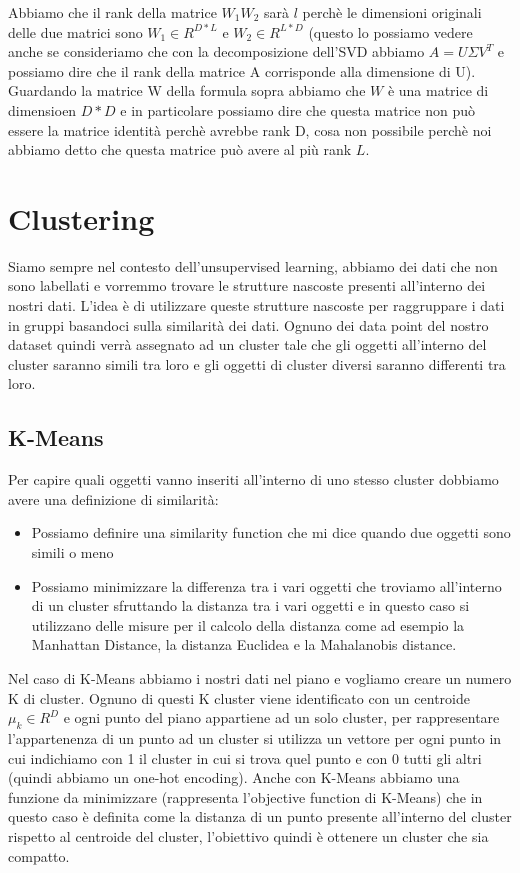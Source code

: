 \documentclass[14pt]{extreport}
\begin{document}
Abbiamo che il rank della matrice $W_1W_2$ sarà $l$ perchè le dimensioni originali delle due matrici sono $W_1 \in R^{D*L}$ e $W_2 \in R^{L*D}$ (questo lo 
possiamo vedere anche se consideriamo che con la decomposizione dell'SVD abbiamo $A = U \Sigma V^{T}$ e possiamo dire che il rank della matrice A corrisponde 
alla dimensione di U).
Guardando la matrice W della formula sopra abbiamo che $W$ è una matrice di dimensioen $D*D$ e in particolare possiamo dire che questa matrice 
non può essere la matrice identità perchè avrebbe rank D, cosa non possibile perchè noi abbiamo detto che questa matrice può avere al più rank $L$.

\chapter{Clustering}

Siamo sempre nel contesto dell'unsupervised learning, abbiamo dei dati che non sono labellati e vorremmo trovare le strutture nascoste presenti all'interno 
dei nostri dati.
L'idea è di utilizzare queste strutture nascoste per raggruppare i dati in gruppi basandoci sulla similarità dei dati.
Ognuno dei data point del nostro dataset quindi verrà assegnato ad un cluster tale che gli oggetti all'interno del cluster saranno simili tra loro 
e gli oggetti di cluster diversi saranno differenti tra loro.

\section{K-Means}

Per capire quali oggetti vanno inseriti all'interno di uno stesso cluster dobbiamo avere una definizione di similarità:
\begin{itemize}
\item Possiamo definire una similarity function che mi dice quando due oggetti sono simili o meno
\item Possiamo minimizzare la differenza tra i vari oggetti che troviamo all'interno di un cluster sfruttando la distanza tra i vari oggetti
e in questo caso si utilizzano delle misure per il calcolo della distanza come ad esempio la Manhattan Distance, la distanza Euclidea e la Mahalanobis distance.
\end{itemize}

Nel caso di K-Means abbiamo i nostri dati nel piano e vogliamo creare un numero K di cluster.
Ognuno di questi K cluster viene identificato con un centroide $\mu_k \in R^D$ e ogni punto del piano appartiene ad un solo cluster, per rappresentare 
l'appartenenza di un punto ad un cluster si utilizza un vettore per ogni punto in cui indichiamo con 1 il cluster in cui si trova quel punto e con 0 
tutti gli altri (quindi abbiamo un one-hot encoding).
Anche con K-Means abbiamo una funzione da minimizzare (rappresenta l'objective function di K-Means) che in questo caso è definita come la distanza di un punto presente all'interno del cluster rispetto 
al centroide del cluster, l'obiettivo quindi è ottenere un cluster che sia compatto.
\end{document}

